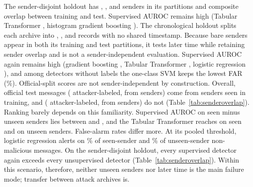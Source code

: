 \documentclass[preprint,12pt,numafflabel]{elsarticle}
\begin{document}
The sender-disjoint holdout has \ResSenderTrainSenders, \ResSenderValidationSenders, and \ResSenderTestSenders{} senders in its partitions and \ResSenderOverlap{} composite overlap between training and test. Supervised AUROC remains high (Tabular Transformer \ResSenderTabTransformerAUROC, histogram gradient boosting \ResSenderHGBAUROC). The chronological holdout splits each archive into \ResChronoTrainRecords, \ResChronoValidationRecords, and \ResChronoTestRecords{} records with no shared timestamp. Because \ResChronoTrainTestSenderOverlap{} bare senders appear in both its training and test partitions, it tests later time while retaining sender overlap and is not a sender-independent evaluation. Supervised AUROC again remains high (gradient boosting \ResChronoHGBAUROC, Tabular Transformer \ResChronoTabTransformerAUROC, logistic regression \ResChronoLogRegAUROC), and among detectors without labels the one-class SVM keeps the lowest FAR (\ResChronoOneClassSVMFAR\%). Official-split scores are not sender-independent by construction. Overall, \ResSeenMessages{} official test messages (\ResSeenAttackers{} attacker-labeled, from \ResSeenSenders{} senders) come from senders seen in training, and \ResUnseenMessages{} (\ResUnseenAttackers{} attacker-labeled, from \ResUnseenSenders{} senders) do not (Table~\ref{tab:senderoverlap}). Ranking barely depends on this familiarity. Supervised AUROC on seen minus unseen senders lies between \ResSeenUnseenSupGapMin{} and \ResSeenUnseenSupGapMax, and the Tabular Transformer reaches \ResSeenTabTransformerAUROC{} on seen and \ResUnseenTabTransformerAUROC{} on unseen senders. False-alarm rates differ more. At its pooled threshold, logistic regression alerts on \ResSeenLogRegFAR\% of seen-sender and \ResUnseenLogRegFAR\% of unseen-sender non-malicious messages. On the sender-disjoint holdout, every supervised detector again exceeds every unsupervised detector (Table~\ref{tab:senderoverlap}). Within this scenario, therefore, neither unseen senders nor later time is the main failure mode; transfer between attack archives is.

\begin{table}
\centering
\caption{Sender familiarity. Official test messages are divided by whether their sender also occurs in the official training split of the same archive; every detector uses its pooled validation-F1 threshold (seed means). The right block repeats all detectors on the sender-disjoint holdout. Takeaway: ranking on unseen senders matches ranking on seen senders, while false-alarm rates at a fixed threshold differ between the two groups.}
\label{tab:senderoverlap}
{\scriptsize}
\end{table}
\end{document}
